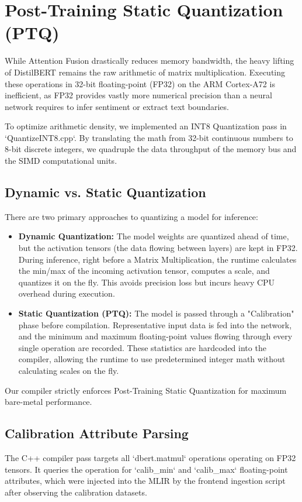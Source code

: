 \section{Post-Training Static Quantization (PTQ)}
While Attention Fusion drastically reduces memory bandwidth, the heavy lifting of DistilBERT remains the raw arithmetic of matrix multiplication. Executing these operations in 32-bit floating-point (FP32) on the ARM Cortex-A72 is inefficient, as FP32 provides vastly more numerical precision than a neural network requires to infer sentiment or extract text boundaries.

To optimize arithmetic density, we implemented an INT8 Quantization pass in `QuantizeINT8.cpp`. By translating the math from 32-bit continuous numbers to 8-bit discrete integers, we quadruple the data throughput of the memory bus and the SIMD computational units.

\subsection{Dynamic vs. Static Quantization}
There are two primary approaches to quantizing a model for inference:
\begin{itemize}
    \item \textbf{Dynamic Quantization:} The model weights are quantized ahead of time, but the activation tensors (the data flowing between layers) are kept in FP32. During inference, right before a Matrix Multiplication, the runtime calculates the min/max of the incoming activation tensor, computes a scale, and quantizes it on the fly. This avoids precision loss but incurs heavy CPU overhead during execution.
    \item \textbf{Static Quantization (PTQ):} The model is passed through a "Calibration" phase before compilation. Representative input data is fed into the network, and the minimum and maximum floating-point values flowing through every single operation are recorded. These statistics are hardcoded into the compiler, allowing the runtime to use predetermined integer math without calculating scales on the fly.
\end{itemize}

Our compiler strictly enforces Post-Training Static Quantization for maximum bare-metal performance.

\subsection{Calibration Attribute Parsing}
The C++ compiler pass targets all `dbert.matmul` operations operating on FP32 tensors. It queries the operation for `calib_min` and `calib_max` floating-point attributes, which were injected into the MLIR by the frontend ingestion script after observing the calibration datasets.

